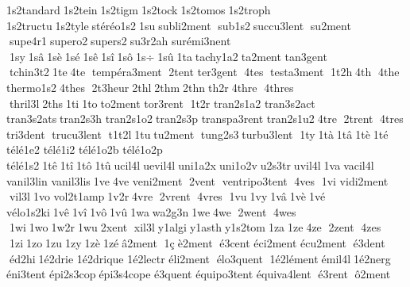 1s2tandard 1s2tein 1s2tigm 1s2tock 1s2tomos 1s2troph 	1s2tructu 1s2tyle stéréo1s2 1su subli2ment  sub1s2 succu3lent  su2ment  supe4r1 supero2 supers2 su3r2ah 
surémi3nent  1sy 1sâ 1sè 1sé 1sê 1sî 1sô 1s÷ 1sû 1ta tachy1a2 ta2ment  	tan3gent  tchin3t2 1te 4te  tempéra3ment  2tent  	ter3gent  4tes  testa3ment  1t2h 4th  4the  	thermo1s2 4thes  2t3heur 2thl 2thm 2thn th2r 4thre  4thres  thril3l 2ths 1ti 1to to2ment  	tor3rent  1t2r 	tran2s1a2 
tran3s2act 
tran3s2ats tran2s3h 	tran2s1o2 tran2s3p 
transpa3rent  	tran2s1u2 4tre  2trent  4tres  	tri3dent  trucu3lent  t1t2l 1tu tu2ment  tung2s3 turbu3lent  1ty 1tà 1tâ 1tè 1té 	télé1e2 	télé1i2 
télé1o2b 
télé1o2p 	télé1s2 1tê 1tî 1tô 1tû ucil4l uevil4l uni1a2x uni1o2v u2s3tr uvil4l 1va vacil4l 	vanil3lin 	vanil3lis 1ve 4ve  
veni2ment  2vent  ventripo3tent  4ves  1vi 
vidi2ment  vil3l 1vo 	vol2t1amp 1v2r 4vre  2vrent  4vres  1vu 1vy 1vâ 1vè 1vé 
vélo1s2ki 1vê 1vî 1vô 1vû 1wa wa2g3n 1we 4we  2went  4wes  1wi 1wo 1w2r 1wu 2xent  xil3l y1algi y1asth y1s2tom 1za 1ze 4ze  2zent  4zes  1zi 1zo 1zu 1zy 1zè 1zé â2ment  1ç è2ment  é3cent  
éci2ment  
écu2ment  é3dent  éd2hi 1é2drie 
1é2drique 	1é2lectr 
éli2ment  élo3quent  1é2lément émil4l 1é2nerg 
éni3tent  
épi2s3cop épi3s4cope 	é3quent  
équipo3tent  
équiva4lent  é3rent  ô2ment 